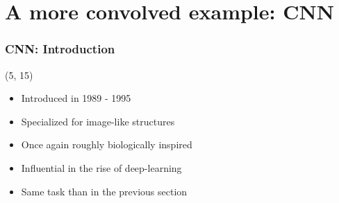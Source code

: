 \section{A more convolved example: \acl{CNN}}


\begin{frame}
  \frametitle{\acl{CNN}: Introduction}

  \begin{textblock}{90}(5, 15)
    \begin{itemize}
    \item Introduced in 1989 - 1995
    \item Specialized for image-like structures
    \item Once again roughly biologically inspired
    \item Influential in the rise of deep-learning
    \item Same task than in the previous section
    \end{itemize}
  \end{textblock}
\end{frame}


